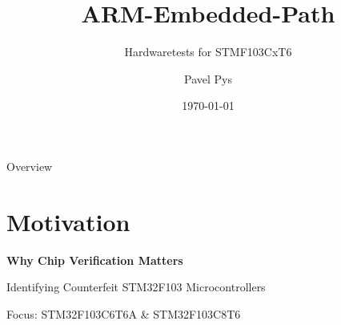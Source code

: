\documentclass{beamer}
\title{ARM-Embedded-Path}
\subtitle{Hardwaretests for STMF103CxT6}
\author{Pavel Pys}
\date{\today}
\begin{document}
\begin{frame}{}
	\maketitle
\end{frame}
\begin{frame}{Overview}
	\tableofcontents
\end{frame}
\section{Motivation}
\begin{frame}
	\begin{center}
		\Huge
		\textbf{Why Chip Verification Matters}
		
		\vspace{1cm}
		
		\Large
		Identifying Counterfeit STM32F103 Microcontrollers
		
		\vspace{1.5cm}
		
		\normalsize
		Focus: STM32F103C6T6A \& STM32F103C8T6
	\end{center}
\end{frame}
\end{document}
